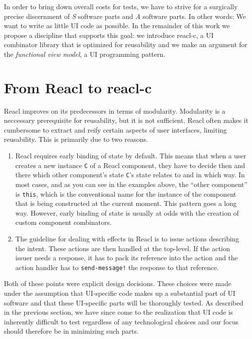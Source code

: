 \documentclass[sigplan,screen]{acmart}
\begin{document}
In order to bring down overall costs for tests, we have to strive for
a surgically precise discernment of \textit{S} software parts and
\textit{A} software parts. In other words: We want to write as little
UI code as possible. In the remainder of this work we propose a
discipline that supports this goal: we introduce reacl-c, a UI
combinator library that is optimized for reusability and we make an
argument for the \textit{functional view model}, a UI programming
pattern.

\section{From Reacl to reacl-c}

Reacl improves on its predecessors in terms of modularity. Modularity
is a neccessary prerequisite for reusability, but it is not
sufficient. Reacl often makes it cumbersome to extract and reify certain
aspects of user interfaces, limiting reusability. This is primarily
due to two reasons.

\begin{enumerate}
  \item Reacl requires early binding of state by default. This means
    that when a user creates a new instance \texttt{C} of a Reacl
    component, they have to decide then and there which other
    component's state \texttt{C}'s state relates to and in which
    way. In most cases, and as you can see in the examples above, the
    ``other component'' is \texttt{this}, which is the conventional
    name for the instance of the component that is being constructed
    at the current moment. This pattern goes a long way. However,
    early binding of state is usually at odds with the creation of
    custom component combinators.
  \item The guideline for dealing with effects in Reacl is to issue
    actions describing the intent. These actions are then handled at
    the top-level. If the action issuer needs a response, it has to
    pack its reference into the action and the action handler has to
    \texttt{send-message!} the response to that reference.
\end{enumerate}

Both of these points were explicit design decisions. These choices
were made under the assumption that UI-specific code makes up a
substantial part of UI software and that these UI-specific parts will
be thoroughly tested. As described in the previous section, we have
since come to the realization that UI code is inherently difficult to
test regardless of any technological choices and our focus should
therefore be in minimizing such parts.
\end{document}
